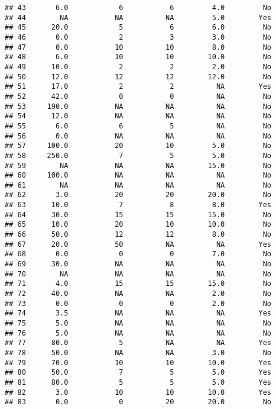 \documentclass[
]{article}
\begin{document}
\begin{verbatim}
## 43       6.0            6           6         4.0         No
## 44        NA           NA          NA         5.0        Yes
## 45      20.0            5           6         6.0         No
## 46       0.0            2           3         3.0         No
## 47       0.0           10          10         8.0         No
## 48       6.0           10          10        10.0         No
## 49      10.0            2           2         2.0         No
## 50      12.0           12          12        12.0         No
## 51      17.0            2           2          NA        Yes
## 52      42.0            0           0          NA         No
## 53     190.0           NA          NA          NA         No
## 54      12.0           NA          NA          NA         No
## 55       6.0            6           5          NA         No
## 56       0.0           NA          NA          NA         No
## 57     100.0           20          10         5.0         No
## 58     250.0            7           5         5.0         No
## 59        NA           NA          NA        15.0         No
## 60     100.0           NA          NA          NA         No
## 61        NA           NA          NA          NA         No
## 62       3.0           20          20        20.0         No
## 63      10.0            7           8         8.0        Yes
## 64      30.0           15          15        15.0         No
## 65      10.0           20          10        10.0         No
## 66      50.0           12          12         8.0         No
## 67      20.0           50          NA          NA        Yes
## 68       0.0            0           0         7.0         No
## 69      30.0           NA          NA          NA         No
## 70        NA           NA          NA          NA         No
## 71       4.0           15          15        15.0         No
## 72      40.0           NA          NA         2.0         No
## 73       0.0            0           0         2.0         No
## 74       3.5           NA          NA          NA        Yes
## 75       5.0           NA          NA          NA         No
## 76       5.0           NA          NA          NA         No
## 77      80.0            5          NA          NA        Yes
## 78      50.0           NA          NA         3.0         No
## 79      70.0           10          10        10.0        Yes
## 80      50.0            7           5         5.0        Yes
## 81      80.0            5           5         5.0        Yes
## 82       3.0           10          10        10.0        Yes
## 83       0.0            0          20        20.0         No

\end{verbatim}
\end{document}
